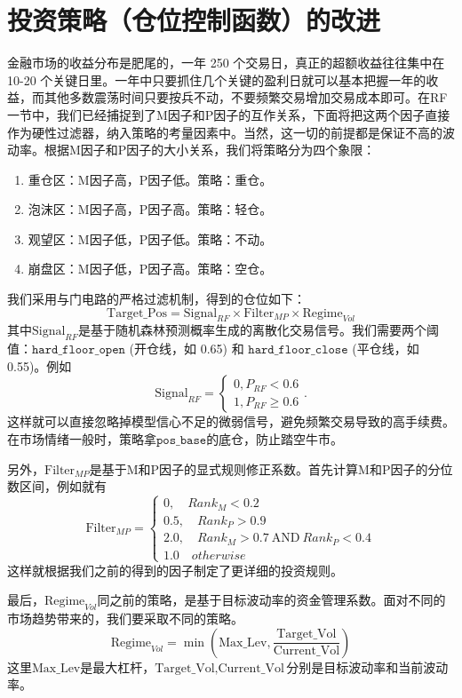 \documentclass[11pt, a4paper]{article}
\begin{document}
\section{投资策略（仓位控制函数）的改进}
金融市场的收益分布是肥尾的，一年 250 个交易日，真正的超额收益往往集中在 10-20 个关键日里。一年中只要抓住几个关键的盈利日就可以基本把握一年的收益，而其他多数震荡时间只要按兵不动，不要频繁交易增加交易成本即可。在RF一节中，我们已经捕捉到了M因子和P因子的互作关系，下面将把这两个因子直接作为硬性过滤器，纳入策略的考量因素中。当然，这一切的前提都是保证不高的波动率。根据M因子和P因子的大小关系，我们将策略分为四个象限：
\begin{enumerate}
  \item 重仓区：M因子高，P因子低。策略：重仓。
  \item 泡沫区：M因子高，P因子高。策略：轻仓。
  \item 观望区：M因子低，P因子低。策略：不动。
  \item 崩盘区：M因子低，P因子高。策略：空仓。
\end{enumerate}
我们采用与门电路的严格过滤机制，得到的仓位如下：
$$\text{Target\_Pos} = \text{Signal}_{RF} \times \text{Filter}_{MP} \times \text{Regime}_{Vol}$$
其中$\text{Signal}_{RF}$是基于随机森林预测概率生成的离散化交易信号。我们需要两个阈值：$\texttt{hard\_floor\_open}$ (开仓线，如 0.65) 和 $\texttt{hard\_floor\_close}$ (平仓线，如 0.55)。例如$$\text{Signal}_{RF}=\begin{cases}
  0,P_{RF}<0.6\\
  1,P_{RF}\ge 0.6
\end{cases}.$$
这样就可以直接忽略掉模型信心不足的微弱信号，避免频繁交易导致的高手续费。在市场情绪一般时，策略拿$\texttt{pos\_base}$的底仓，防止踏空牛市。

另外，$\text{Filter}_{MP}$是基于M和P因子的显式规则修正系数。首先计算M和P因子的分位数区间，例如就有
$$\text{Filter}_{MP} = \begin{cases}
  0, \quad Rank_M < 0.2\\
  0.5, \quad Rank_P > 0.9\\
  2.0, \quad Rank_M > 0.7 \ \text{AND} \ Rank_P < 0.4\\
  1.0 \quad otherwise
\end{cases}$$
这样就根据我们之前的得到的因子制定了更详细的投资规则。

最后，$\text{Regime}_{Vol}$同之前的策略，是基于目标波动率的资金管理系数。面对不同的市场趋势带来的，我们要采取不同的策略。
$$\text{Regime}_{Vol} = \min \left( \text{Max\_Lev}, \frac{\text{Target\_Vol}}{\text{Current\_Vol}} \right)$$
这里$\text{Max\_Lev}$是最大杠杆，$\text{Target\_Vol},\text{Current\_Vol}$分别是目标波动率和当前波动率。
\end{document}
